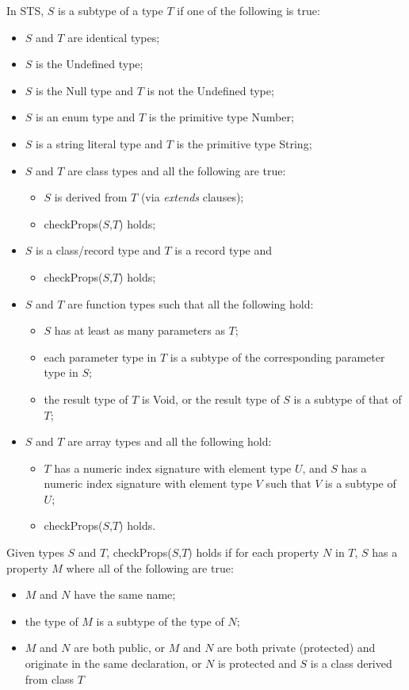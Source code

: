 In STS, $S$ is a subtype of a type $T$ if one of the following is true:
\begin{itemize}
\item $S$ and $T$ are identical types;
\item $S$ is the Undefined type;
\item $S$ is the Null type and $T$ is not the Undefined type;
\item $S$ is an enum type and $T$ is the primitive type Number;
\item $S$ is a string literal type and $T$ is the primitive type String;
\item $S$ and $T$ are class types and all the following are true:
\begin{itemize}
  \item $S$ is derived from $T$ (via \emph{extends} clauses);
  \item checkProps($S$,$T$) holds;
\end{itemize}
\item $S$ is a class/record type and $T$ is a record type and
\begin{itemize}
  \item checkProps($S$,$T$) holds;
\end{itemize}
\item $S$ and $T$ are function types such that all the following hold:
\begin{itemize}
  \item $S$ has at least as many parameters as $T$;
  \item each parameter type in $T$ is a subtype of the corresponding parameter type in $S$;
  \item the result type of $T$ is Void, or the result type of $S$ is a subtype of that of $T$;
\end{itemize}
\item $S$ and $T$ are array types and all the following hold:
\begin{itemize}
\item $T$ has a numeric index signature with element type $U$, 
    and $S$ has a numeric index signature with element type $V$
    such that $V$ is a subtype of $U$;
\item checkProps($S$,$T$) holds.
\end{itemize}
\end{itemize}


Given types $S$ and $T$, checkProps($S$,$T$) holds if for each property $N$ in $T$, 
$S$ has a property $M$ where all of the following are true:
\begin{itemize}
\item $M$ and $N$ have the same name;
\item the type of $M$ is a subtype of the type of $N$;
\item $M$ and $N$ are both public, or $M$ and $N$ are both 
      private (protected) and originate in the same declaration, 
      or $N$ is protected and $S$ is a class derived from class $T$
\end{itemize}

